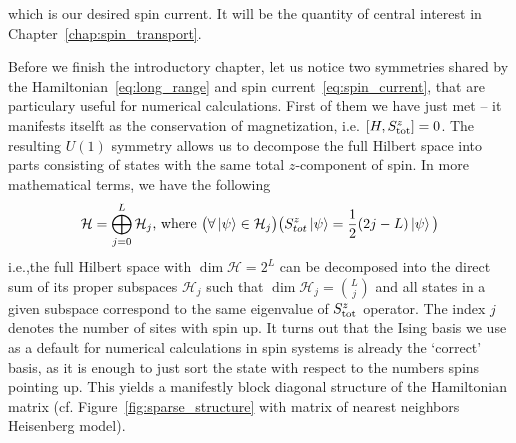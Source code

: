 which is our desired spin current. It will be the quantity of central interest in Chapter~\ref{chap:spin_transport}.

Before we finish the introductory chapter, let us notice two symmetries shared by the 
Hamiltonian~\eqref{eq:long_range} and spin current~\eqref{eq:spin_current}, that are particulary useful for numerical calculations.
First of them we have just met -- it manifests itselft as the conservation of magnetization,
i.e. \(\comm{H}{\Sz_{\mathrm{tot}}}=0\).
The resulting \(U(1)\) symmetry allows us to decompose the full Hilbert space into parts consisting of states with the same total \(z\)-component
of spin. In more mathematical terms, we have the following
\begin{equation*}
  \mathcal{H} = \bigoplus_{j = 0}^{L} \mathcal{H}_j \text{, where } \big(\forall \ket{\psi} \in \mathcal{H}_j \big) \big(S^{z}_{tot} \ket{\psi} = \frac{1}{2}(2j-L) \ket{\psi} \big)
\end{equation*}
i.e.,the full Hilbert space with \(\dim{\mathcal{H}} = 2^L\) can be decomposed into the direct sum of its proper subspaces
\(\mathcal{H}_j\) such that \(\dim{\mathcal{H}_j} = \binom{L}{j}\) and all states in a given subspace correspond to the same
eigenvalue of \(S^{z}_{\mathrm{tot}}\) operator. The index \(j\) denotes the number of sites with spin up.
It turns out that the Ising basis we use as a default for numerical calculations in spin systems
is already the `correct' basis, as it is enough to just sort the state with respect to the numbers
spins pointing up. This yields a manifestly block diagonal structure of the Hamiltonian matrix
(cf. Figure~\ref{fig:sparse_structure} with matrix of nearest neighbors Heisenberg model).
